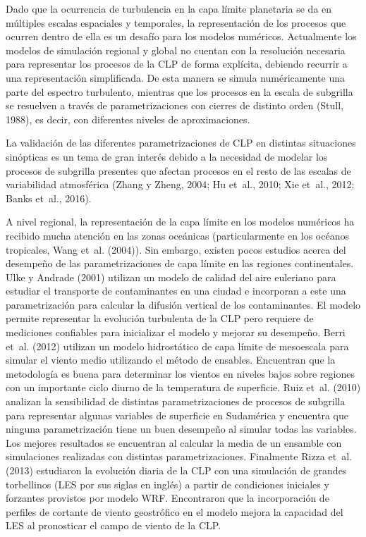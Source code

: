 \documentclass[12pt,spanish,oneside, a4paper]{book}
\begin{document}
Dado que la ocurrencia de turbulencia en la capa límite planetaria se da
en múltiples escalas espaciales y temporales, la representación de los
procesos que ocurren dentro de ella es un desafío para los modelos
numéricos. Actualmente los modelos de simulación regional y global no
cuentan con la resolución necesaria para representar los procesos de la
CLP de forma explícita, debiendo recurrir a una representación
simplificada. De esta manera se simula numéricamente una parte del
espectro turbulento, mientras que los procesos en la escala de subgrilla
se resuelven a través de parametrizaciones con cierres de distinto orden
(Stull, 1988), es decir, con diferentes niveles de aproximaciones.

La validación de las diferentes parametrizaciones de CLP en distintas
situaciones sinópticas es un tema de gran interés debido a la necesidad
de modelar los procesos de subgrilla presentes que afectan procesos en
el resto de las escalas de variabilidad atmosférica (Zhang y Zheng,
2004; Hu et~al., 2010; Xie et~al., 2012; Banks et~al., 2016).

A nivel regional, la representación de la capa límite en los modelos
numéricos ha recibido mucha atención en las zonas oceánicas
(particularmente en los océanos tropicales, Wang et~al. (2004)). Sin
embargo, existen pocos estudios acerca del desempeño de las
parametrizaciones de capa límite en las regiones continentales. Ulke y
Andrade (2001) utilizan un modelo de calidad del aire euleriano para
estudiar el transporte de contaminantes en una ciudad e incorporan a
este una parametrización para calcular la difusión vertical de los
contaminantes. El modelo permite representar la evolución turbulenta de
la CLP pero requiere de mediciones confiables para inicializar el modelo
y mejorar su desempeño. Berri et~al. (2012) utilizan un modelo
hidrostático de capa límite de mesoescala para simular el viento medio
utilizando el método de ensables. Encuentran que la metodología es buena
para determinar los vientos en niveles bajos sobre regiones con un
importante ciclo diurno de la temperatura de superficie. Ruiz et~al.
(2010) analizan la sensibilidad de distintas parametrizaciones de
procesos de subgrilla para representar algunas variables de superficie
en Sudamérica y encuentra que ninguna parametrización tiene un buen
desempeño al simular todas las variables. Los mejores resultados se
encuentran al calcular la media de un ensamble con simulaciones
realizadas con distintas parametrizaciones. Finalmente Rizza et~al.
(2013) estudiaron la evolución diaria de la CLP con una simulación de
grandes torbellinos (LES por sus siglas en inglés) a partir de
condiciones iniciales y forzantes provistos por modelo WRF. Encontraron
que la incorporación de perfiles de cortante de viento geostrófico en el
modelo mejora la capacidad del LES al pronosticar el campo de viento de
la CLP.
\end{document}
